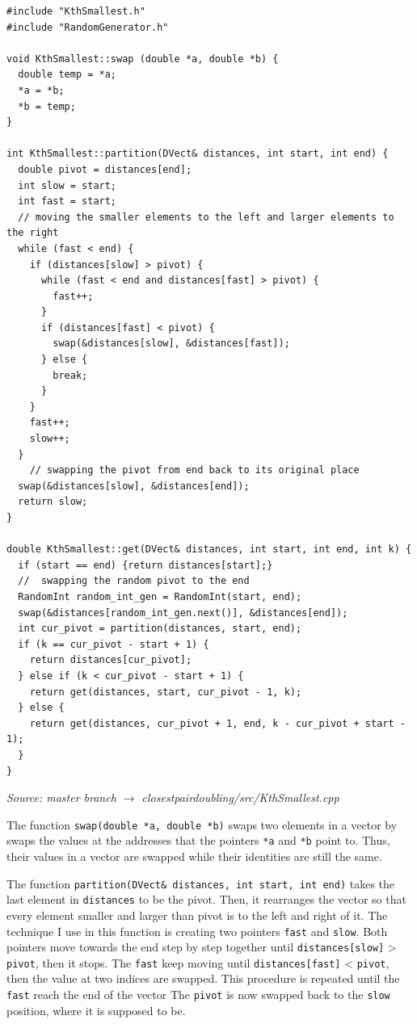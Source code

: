 \documentclass[12pt,english,]{article}
\newcommand{\code}[1]{\colorbox{light-gray}{\texttt{#1}}}
\begin{document}
\begin{lstlisting}
#include "KthSmallest.h"
#include "RandomGenerator.h"

void KthSmallest::swap (double *a, double *b) {
  double temp = *a;
  *a = *b;
  *b = temp;
}

int KthSmallest::partition(DVect& distances, int start, int end) {
  double pivot = distances[end];
  int slow = start;
  int fast = start;
  // moving the smaller elements to the left and larger elements to the right
  while (fast < end) {
    if (distances[slow] > pivot) {
      while (fast < end and distances[fast] > pivot) {
        fast++;
      }
      if (distances[fast] < pivot) {
        swap(&distances[slow], &distances[fast]);
      } else {
        break;
      }
    }
    fast++;
    slow++;
  }
    // swapping the pivot from end back to its original place
  swap(&distances[slow], &distances[end]);
  return slow;
}

double KthSmallest::get(DVect& distances, int start, int end, int k) {
  if (start == end) {return distances[start];}
  //  swapping the random pivot to the end
  RandomInt random_int_gen = RandomInt(start, end);
  swap(&distances[random_int_gen.next()], &distances[end]);
  int cur_pivot = partition(distances, start, end);
  if (k == cur_pivot - start + 1) {
    return distances[cur_pivot];
  } else if (k < cur_pivot - start + 1) {
    return get(distances, start, cur_pivot - 1, k);
  } else {
    return get(distances, cur_pivot + 1, end, k - cur_pivot + start - 1);
  }
}

\end{lstlisting}
\vspace{-9truemm}
\begin{minipage}{1\textwidth}
  \begin{flushright}
  {\footnotesize \emph{Source: master branch $\rightarrow$ closestpairdoubling/src/KthSmallest.cpp}\par}
  \end{flushright}
\end{minipage}
\vspace{0.5truemm}

The function \code{swap(double *a, double *b)} swaps two elements in a
vector by swaps the values at the addresses that the pointers \code{*a}
and \code{*b} point to. Thus, their values in a vector are swapped while
their identities are still the same.

The function \code{partition(DVect\& distances, int start, int end)}
takes the last element in \code{distances} to be the pivot. Then, it
rearranges the vector so that every element smaller and larger than
pivot is to the left and right of it. The technique I use in this
function is creating two pointers \code{fast} and \code{slow}. Both
pointers move towards the end step by step together until
\code{distances[slow]} \textgreater{} \code{pivot}, then it stops. The
\code{fast} keep moving until \code{distances[fast]} \textless{}
\code{pivot}, then the value at two indices are swapped. This procedure
is repeated until the \code{fast} reach the end of the vector The
\code{pivot} is now swapped back to the \code{slow} position, where it
is supposed to be.
\end{document}
